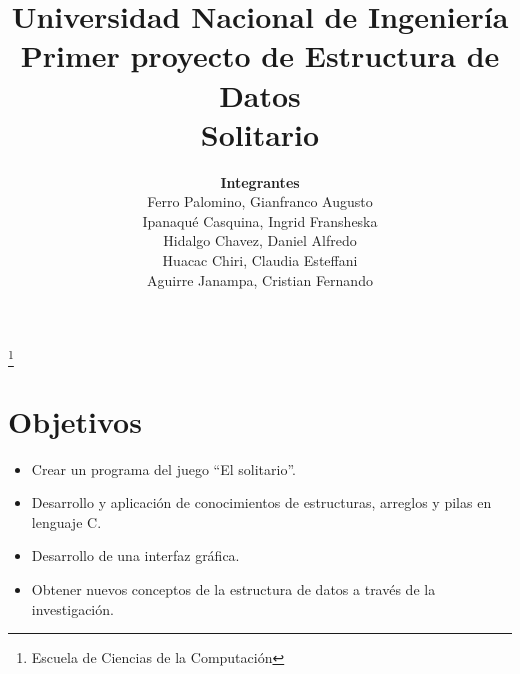 \documentclass[11pt,a4paper]{article}
\begin{document}
\title{Universidad Nacional de Ingeniería\\
Primer proyecto de Estructura de Datos\\
Solitario
}
\author{{\bf Integrantes}\\
Ferro Palomino, Gianfranco Augusto\\
Ipanaqué Casquina, Ingrid Fransheska\\
Hidalgo Chavez, Daniel Alfredo\\
Huacac Chiri, Claudia Esteffani\\
Aguirre Janampa, Cristian Fernando}
\thanks{ Escuela de Ciencias de la Computación}
\maketitle
\tableofcontents

\section{Objetivos}
\begin{itemize}
\item Crear un programa del juego “El solitario”.
\item Desarrollo y aplicación de conocimientos de estructuras, arreglos y pilas en lenguaje C.
\item Desarrollo de una interfaz gráfica.
\item Obtener nuevos conceptos de la estructura de datos a través de la investigación.
\end{itemize}
\end{document}
